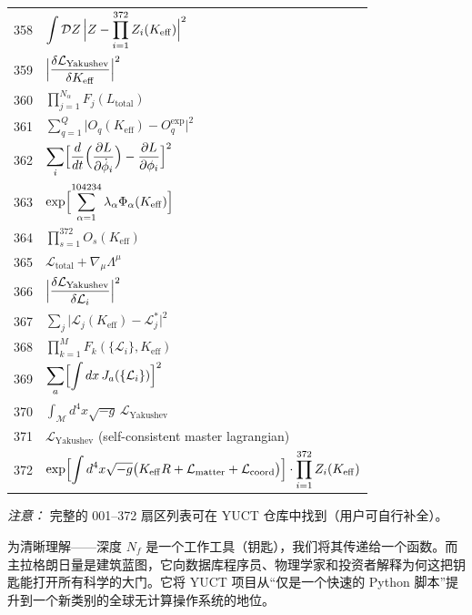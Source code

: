 \documentclass[11pt,a4paper]{article}
\begin{document}
\begin{longtable}{r p{}}
	358 & \(\displaystyle \int\mathcal{D}Z\,\Bigl|Z - \prod_{i=1}^{372}Z_i(K_{\mathrm{eff}})\Bigr|^2\) \\
	359 & \(\displaystyle \Bigl|\frac{\delta\mathcal{L}_{\text{Yakushev}}}{\delta K_{\mathrm{eff}}}\Bigr|^2\) \\
	360 & \(\displaystyle \prod_{j=1}^{N_\alpha}F_j(L_{\text{total}})\) \\
	361 & \(\displaystyle \sum_{q=1}^Q\bigl|O_q(K_{\mathrm{eff}}) - O_q^{\text{exp}}\bigr|^2\) \\
	362 & \(\displaystyle \sum_i\Bigl[\frac{d}{dt}\Bigl(\frac{\partial L}{\partial\dot\phi_i}\Bigr) - \frac{\partial L}{\partial\phi_i}\Bigr]^2\) \\
	363 & \(\displaystyle \exp\Bigl[\sum_{\alpha=1}^{104234}\lambda_\alpha\Phi_\alpha(K_{\mathrm{eff}})\Bigr]\) \\
	364 & \(\displaystyle \prod_{s=1}^{372}O_s(K_{\mathrm{eff}})\) \\
	365 & \(\displaystyle \mathcal{L}_{\text{total}} + \nabla_\mu\Lambda^\mu\) \\
	366 & \(\displaystyle \Bigl|\frac{\delta\mathcal{L}_{\text{Yakushev}}}{\delta\mathcal{L}_i}\Bigr|^2\) \\
	367 & \(\displaystyle \sum_j\bigl|\mathcal{L}_j(K_{\mathrm{eff}}) - \mathcal{L}_j^*\bigr|^2\) \\
	368 & \(\displaystyle \prod_{k=1}^M F_k(\{\mathcal{L}_i\},K_{\mathrm{eff}})\) \\
	369 & \(\displaystyle \sum_a\Bigl[\int dx\,J_a(\{\mathcal{L}_i\})\Bigr]^2\) \\
	370 & \(\displaystyle \int_{\mathcal{M}} d^4x\sqrt{-g}\,\mathcal{L}_{\text{Yakushev}}\) \\
	371 & \(\displaystyle \mathcal{L}_{\text{Yakushev}}\) (self-consistent master lagrangian) \\
	372 & \(\displaystyle \exp\Bigl[\int d^4x\sqrt{-g}\bigl(K_{\mathrm{eff}}R + \mathcal{L}_{\text{matter}} + \mathcal{L}_{\text{coord}}\bigr)\Bigr]\cdot\prod_{i=1}^{372}Z_i(K_{\mathrm{eff}})\) \\
	
\end{longtable}
	
	\textit{注意：} 完整的 001–372 扇区列表可在 YUCT 仓库中找到（用户可自行补全）。
	
	\small
	为清晰理解——深度 \(N_{f}\) 是一个工作工具（钥匙），我们将其传递给一个函数。而主拉格朗日量是建筑蓝图，它向数据库程序员、物理学家和投资者解释为何这把钥匙能打开所有科学的大门。它将 YUCT 项目从“仅是一个快速的 Python 脚本”提升到一个新类别的全球无计算操作系统的地位。
	
\end{document}
